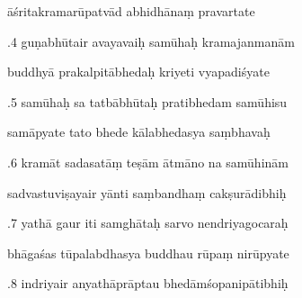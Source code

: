\documentclass[article,12pt,a4paper]{memoir}%
\newcounter{parCount}
\begin{document}
	  
	  \pstart \leavevmode%
	āśritakramarūpatvād abhidhānaṃ pravartate 
	{}
	\pend%
      

	  
	  \pstart {}.4 guṇabhūtair avayavaiḥ samūhaḥ kramajanmanām 
	{}
	\pend%
      

	  
	  \pstart \leavevmode%
	buddhyā prakalpitābhedaḥ kriyeti vyapadiśyate 
	{}
	\pend%
      

	  
	  \pstart {}.5 samūhaḥ sa tatbābhūtaḥ pratibhedam samūhisu 
	{}
	\pend%
      

	  
	  \pstart \leavevmode%
	samāpyate tato bhede kālabhedasya saṃbhavaḥ 
	{}
	\pend%
      

	  
	  \pstart {}.6 kramāt sadasatāṃ teṣām ātmāno na samūhinām 
	{}
	\pend%
      

	  
	  \pstart \leavevmode%
	sadvastuviṣayair yānti saṃbandhaṃ cakṣurādibhiḥ 
	{}
	\pend%
      

	  
	  \pstart {}.7 yathā gaur iti samghātaḥ sarvo nendriyagocaraḥ 
	{}
	\pend%
      

	  
	  \pstart \leavevmode%
	bhāgaśas tūpalabdhasya buddhau rūpaṃ nirūpyate 
	{}
	\pend%
      

	  
	  \pstart {}.8 indriyair anyathāprāptau bhedāmśopanipātibhiḥ 
	{}
	\pend%
      
\end{document}
